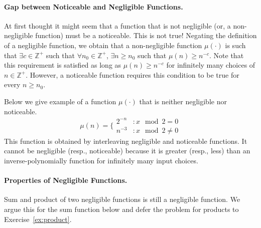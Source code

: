 \paragraph{Gap between Noticeable and Negligible Functions.}
At first thought it might seem that a function that is {not} negligible (or, a non-negligible function) must be a noticeable. This is not true!\cite{JC:Bellare02} Negating the definition of a negligible function, we obtain that a non-negligible function $\mu(\cdot)$ is such that $\exists c \in \mathbb{Z}^+$ such that $\forall n_0 \in \mathbb{Z}^+$, $\exists n \geq n_0$ such that $\mu(n) \geq n^{-c}$.
Note that this requirement is satisfied as long as $\mu(n) \geq n^{-c}$ for infinitely many choices of $n \in \mathbb{Z}^+$. However, a noticeable function requires this condition to be true for every $n \geq n_0$.

Below we give example of a function $\mu(\cdot)$ that is neither negligible nor noticeable.
$$\mu(n) = \Big\{
\begin{array}{ll}
  2^{-n} & : x \mod 2 = 0\\
  n^{-3} & : x \mod 2 \neq 0
\end{array}
$$
This function is obtained by interleaving negligible and  noticeable functions. It cannot be negligible (resp., noticeable) because it is greater (resp., less) than an inverse-polynomially function for infinitely many input choices.

\paragraph{Properties of Negligible Functions.} Sum and product of two negligible functions is still a negligible function. We argue this for the sum function below and defer the problem for products to Exercise~\ref{ex:product}.

